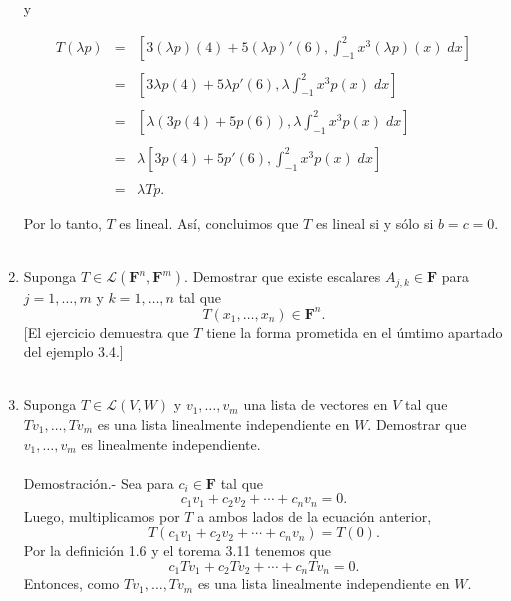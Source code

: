 \begin{enumerate}[\bfseries 1.]
	\begin{center}
	y 
	\end{center}

	$$
	\begin{array}{rcl}
	    T(\lambda p) &=& \left[3(\lambda p)(4)+5(\lambda p)'(6),\displaystyle\int_{-1}^2 x^3(\lambda p)(x)\; dx\right]\\\\
			 &=& \left[3\lambda p(4)+5\lambda p'(6),\lambda\displaystyle\int_{-1}^2 x^3 p(x)\; dx\right]\\\\
			 &=& \left[\lambda(3p(4)+5p(6)),\lambda \displaystyle\int_{-1}^2 x^3p(x)\; dx\right]\\\\
			 &=& \lambda\left[3p(4)+5p'(6),\displaystyle\int_{-1}^2 x^3 p(x)\; dx\right]\\\\
			 &=& \lambda Tp.
	\end{array}
	$$

	Por lo tanto, $T$ es lineal. Así, concluimos que $T$ es lineal si y sólo si $b=c=0$.\\\\


    \item Suponga $T\in \mathcal{L}\left(\textbf{F}^n,\textbf{F}^m\right)$. Demostrar que existe escalares $A_{j,k}\in \textbf{F}$ para $j=1,\ldots,m$ y $k=1,\ldots,n$ tal que
    $$T\left(x_1,\ldots,x_n\right)\in \textbf{F}^n.$$
    [El ejercicio demuestra que $T$ tiene la forma prometida en el úmtimo apartado del ejemplo 3.4.]\\\\

    \item Suponga $T\in \mathcal{L}(V,W)$ y $v_1,\ldots, v_m$ una lista de vectores en $V$ tal que $Tv_1,\ldots,Tv_m$ es una lista linealmente independiente en $W$. Demostrar que $v_1,\ldots,v_m$ es linealmente independiente.\\\\
	Demostración.-\; Sea para $c_i\in \textbf{F}$ tal que 
	$$c_1v_1+c_2v_2+\cdots+c_nv_n=0.$$
	Luego, multiplicamos por $T$ a ambos lados de la ecuación anterior,
	$$T(c_1v_1+c_2v_2+\cdots+c_nv_n)=T(0).$$
	Por la definición 1.6 y el torema 3.11 tenemos que
	$$c_1Tv_1+c_2Tv_2+\cdots+c_nTv_n=0.$$
	Entonces, como $Tv_1,\ldots,Tv_m$ es una lista linealmente independiente en $W$.\\\\


\end{enumerate}

